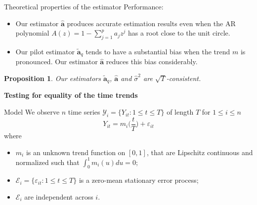 \documentclass[10pt]{beamer}
\newtheorem{prop}{Proposition}
\begin{document}
\begin{frame}{Theoretical properties of the estimator}
Performance:
\begin{itemize}
\item Our estimator $\widehat{\boldsymbol{a}}$ produces accurate estimation results even when the AR polynomial $A(z) = 1 - \sum_{j=1}^p a_j z^j$ has a root close to the unit circle.\pause
\item Our pilot estimator $\widetilde{\boldsymbol{a}}_q$ tends to have a substantial bias when the trend $m$ is pronounced. Our estimator $\widehat{\boldsymbol{a}}$ reduces this bias considerably.\pause
\end{itemize}
\begin{prop}{}
Our estimators $\widetilde{\boldsymbol{a}}_q$, $\widehat{\boldsymbol{a}}$ and $\widehat{\sigma}^2$ are $\sqrt{T}$-consistent. 
\end{prop}
\end{frame}

\begin{frame}
\thispagestyle{empty}
\begin{center}
\Large{\textbf{Testing for equality of the time trends}}
\end{center}
\end{frame}

\begin{frame}{Model}
We observe $n$ time series $\mathcal{Y}_i = \{Y_{it}: 1 \le t \le T \}$ of length $T$ for $1 \le i \le n$
\begin{equation*}\label{model2}
Y_{it} = m_i \Big( \frac{t}{T} \Big) + \varepsilon_{it} 
\end{equation*}\pause
\vspace{-3mm}
where
\begin{itemize}
\item $m_i$ is an unknown trend function on $[0,1]$, that are Lipschitz continuous and normalized such that $\int_0^1 m_i(u)du = 0$;
\item $\mathcal{E}_i = \{ \varepsilon_{it}: 1 \le t \le T \}$ is a zero-mean stationary error process;
\item $\mathcal{E}_i$ are independent across $i$.
\end{itemize}
\end{frame}
\end{document}
